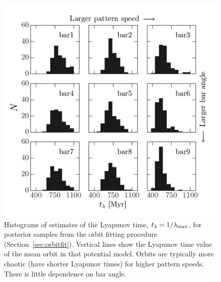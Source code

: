 \documentclass[letterpaper,12pt,preprint]{aastex}
\newcommand{\lyapexp}{\lambda_{\rm max}}
\newcommand{\lyapt}{t_\lambda}
\begin{document}
\clearpage
\begin{figure}[p]
\begin{center}
\includegraphics[width=\textwidth]{figures/lyapunov-hist}
\caption{ Histograms of estimates of the Lyapunov time, $\lyapt=1/\lyapexp$, for posterior samples from the orbit fitting procedure (Section~\ref{sec:orbitfit}). Vertical lines show the Lyapunov time value of the mean orbit in that potential model. Orbits are typically more chaotic (have shorter Lyapunov times) for higher pattern speeds. There is little dependence on bar angle.}
\label{fig:lyapunov-hist}
\end{center}
\end{figure}
\end{document}
